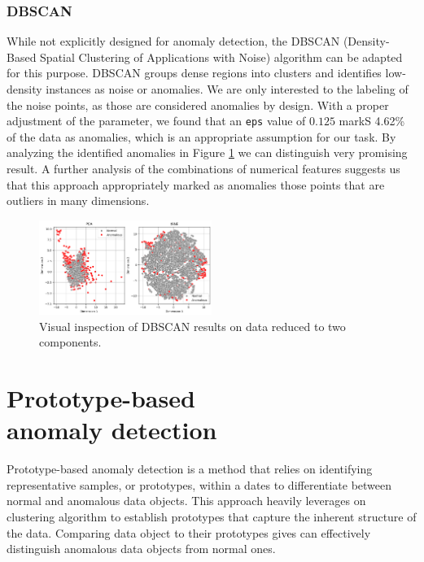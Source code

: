 \documentclass[9pt,twocolumn]{article}
\begin{document}
\subsubsection{DBSCAN}
While not explicitly designed for anomaly detection, the DBSCAN (Density-Based Spatial Clustering of Applications with Noise) algorithm can be adapted for this purpose. DBSCAN groups dense regions into clusters and identifies low-density instances as noise or anomalies. We are only interested to the labeling of the noise points, as those are considered anomalies by design. With a proper adjustment of the parameter, we found that an \texttt{eps} value of $0.125$ markS 4.62\% of the data as anomalies, which is an appropriate assumption for our task. By analyzing the identified anomalies in Figure \ref{fig:dbscan_pcatsne} we can distinguish very promising result. A further analysis of the combinations of numerical features suggests us that this approach appropriately marked as anomalies those points that are outliers in many dimensions.
\begin{figure}[h]
    \centering
    \includegraphics[width=0.5\textwidth]{images/DBSCAN_PCATSNE.png}
    \caption{Visual inspection of DBSCAN results on data reduced to two components.}
    \label{fig:dbscan_pcatsne}
\end{figure}

\section{Prototype-based\\anomaly detection}
Prototype-based anomaly detection is a method that relies on identifying representative samples, or prototypes, within a dates to differentiate between normal and anomalous data objects. This approach heavily leverages on clustering algorithm to establish prototypes that capture the inherent structure of the data. Comparing data object to their prototypes gives can effectively distinguish anomalous data objects from normal ones.
\end{document}
